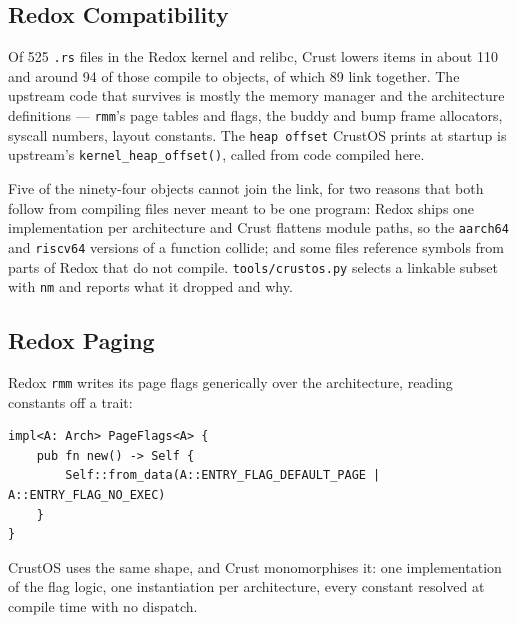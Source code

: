\subsection{Redox Compatibility}

Of 525 \texttt{.rs} files in the Redox kernel and relibc, Crust lowers items in
about 110 and around 94 of those compile to objects, of which 89 link
together. The upstream code that survives is mostly the memory manager and the
architecture definitions --- \texttt{rmm}'s page tables and flags, the buddy
and bump frame allocators, syscall numbers, layout constants. The
\texttt{heap offset} CrustOS prints at startup is upstream's
\texttt{kernel\_heap\_offset()}, called from code compiled here.

Five of the ninety-four objects cannot join the link, for two reasons that
both follow from compiling files never meant to be one program: Redox ships
one implementation per architecture and Crust flattens module paths, so the
\texttt{aarch64} and \texttt{riscv64} versions of a function collide; and some
files reference symbols from parts of Redox that do not compile.
\texttt{tools/crustos.py} selects a linkable subset with \texttt{nm} and
reports what it dropped and why.

\subsection{Redox Paging}

Redox \texttt{rmm} writes its page flags generically over the architecture, reading
constants off a trait:

\begin{verbatim}
impl<A: Arch> PageFlags<A> {
    pub fn new() -> Self {
        Self::from_data(A::ENTRY_FLAG_DEFAULT_PAGE | A::ENTRY_FLAG_NO_EXEC)
    }
}
\end{verbatim}

CrustOS uses the same shape, and Crust monomorphises it: one implementation of
the flag logic, one instantiation per architecture, every constant resolved at
compile time with no dispatch.

